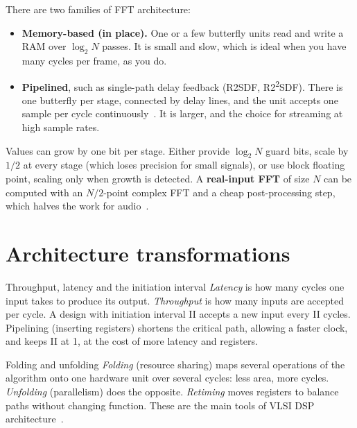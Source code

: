 There are two families of FFT architecture:
\begin{itemize}
  \item \textbf{Memory-based (in place).} One or a few butterfly units read and
        write a RAM over $\log_2 N$ passes. It is small and slow, which is ideal
        when you have many cycles per frame, as you do.
  \item \textbf{Pipelined}, such as single-path delay feedback (R2SDF,
        R2\textsuperscript{2}SDF). There is one butterfly per stage, connected by
        delay lines, and the unit accepts one sample per cycle
        continuously~\cite{he1996r22sdf,ch12-13:garrido2022fft}. It is larger,
        and the choice for streaming at high sample rates.
\end{itemize}
Values can grow by one bit per stage. Either provide $\log_2 N$ guard bits,
scale by $1/2$ at every stage (which loses precision for small signals), or use
block floating point, scaling only when growth is detected. A \textbf{real-input
FFT} of size $N$ can be computed with an $N/2$-point complex FFT and a cheap
post-processing step, which halves the work for audio~\cite{oppenheim2010dtsp}.

\section{Architecture transformations}\label{sec:primer:arch}

\begin{conceptbox}{Throughput, latency and the initiation interval}
\emph{Latency} is how many cycles one input takes to produce its output.
\emph{Throughput} is how many inputs are accepted per cycle. A design with
initiation interval II accepts a new input every II cycles. Pipelining
(inserting registers) shortens the critical path, allowing a faster clock, and
keeps II at 1, at the cost of more latency and registers.
\end{conceptbox}

\begin{conceptbox}{Folding and unfolding}
\emph{Folding} (resource sharing) maps several operations of the algorithm onto
one hardware unit over several cycles: less area, more cycles. \emph{Unfolding}
(parallelism) does the opposite. \emph{Retiming} moves registers to balance
paths without changing function. These are the main tools of VLSI DSP
architecture~\cite{parhi1999vlsidsp}.
\end{conceptbox}

